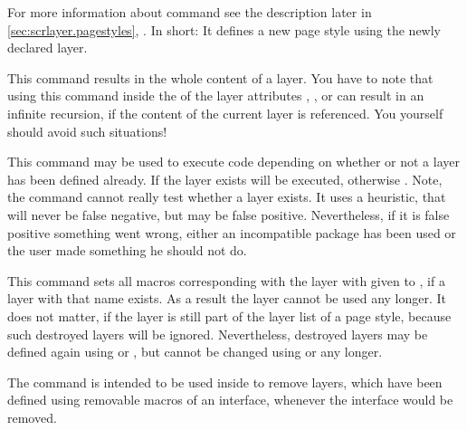 For more information about command
 see
the description later in \autoref{sec:scrlayer.pagestyles},
. In short: It
defines a new page style using the newly declared layer.%
\EndIndexGroup


\begin{Declaration}
\end{Declaration}
This command results in the whole content
of a layer. You have to note that using this
command inside the  of the layer attributes ,
, or  can result in
an infinite recursion, if the content of the current layer is referenced. You
yourself should avoid such situations!%
\EndIndexGroup


\begin{Declaration}
\end{Declaration}
This command may be used to execute code depending on whether or not a layer
has been defined already. If the layer exists  will be
executed, otherwise . Note, the command cannot really
test whether a layer exists. It uses a heuristic, that will never be false
negative, but may be false positive. Nevertheless, if it is false positive
something went wrong, either an incompatible package has been used or the user
made something he should not do.%
\EndIndexGroup


\begin{Declaration}
\end{Declaration}
This command sets all macros corresponding with the layer with given
 to , if a layer with that name exists. As a result the layer cannot be used any longer. It does not matter, if the layer
is still part of the layer list of a page style, because such destroyed layers
will be ignored. Nevertheless, destroyed layers may be defined again using
 or , but cannot be changed using
 or  any longer. 

The command is intended to be used inside
 to remove layers, which have been
defined using removable macros of an interface, whenever the interface would
be removed.%
\EndIndexGroup


